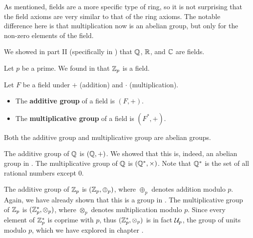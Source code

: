 As mentioned, fields are a more specific type of ring, so it is not surprising that the field axioms are very similar to that of the ring axioms. The notable difference here is that multiplication now is an abelian group, but only for the non-zero elements of the field.

\begin{example}
    We showed in part II (specifically in ) that $\mathbb{Q}$, $\mathbb{R}$, and $\mathbb{C}$ are fields.
\end{example}

\begin{example}
    Let $p$ be a prime. We found in  that $\mathbb{Z}_p$ is a field.
\end{example}

\begin{definition}
    Let $F$ be a field under $+$ (addition) and $\cdot$ (multiplication).
    \begin{itemize}
        \item The \textbf{additive group} of a field is $(F, +)$.
        \item The \textbf{multiplicative group} of a field is $(F^\ast, +)$.
    \end{itemize}
    Both the additive group and multiplicative group are abelian groups.
\end{definition}

\begin{example}
    The additive group of $\mathbb{Q}$ is $(\mathbb{Q}, +)$. We showed that this is, indeed, an abelian group in . The multiplicative group of $\mathbb{Q}$ is $(\mathbb{Q}^\ast, \times)$. Note that $\mathbb{Q}^\ast$ is the set of all rational numbers except 0.
\end{example}

\begin{example}
    The additive group of $\mathbb{Z}_p$ is $(\mathbb{Z}_p, \oplus_p)$, where $\oplus_p$ denotes addition modulo $p$. Again, we have already shown that this is a group in . The multiplicative group of $\mathbb{Z}_p$ is $(\mathbb{Z}_p^\ast, \otimes_p)$, where $\otimes_p$ denotes multiplication modulo $p$. Since every element of $\mathbb{Z}_p^\ast$ is coprime with $p$, thus $(\mathbb{Z}_p^\ast, \otimes_p)$ is in fact $\mathcal{U}_{p}$, the group of units modulo $p$, which we have explored in chapter .
\end{example}

